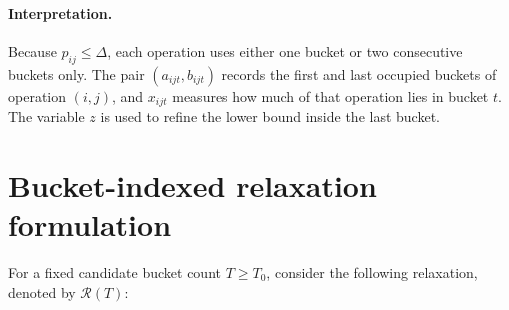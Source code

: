 \documentclass[11pt]{article}
\begin{document}
\paragraph{Interpretation.}
Because $p_{ij}\le \Delta$, each operation uses either one bucket or two consecutive buckets only.
The pair $(a_{ijt},b_{ijt})$ records the first and last occupied buckets of operation $(i,j)$, and $x_{ijt}$ measures how much of that operation lies in bucket $t$.
The variable $z$ is used to refine the lower bound inside the last bucket.

\section{Bucket-indexed relaxation formulation}

For a fixed candidate bucket count $T\ge T_0$, consider the following relaxation, denoted by $\mathcal R(T)$:
\end{document}
